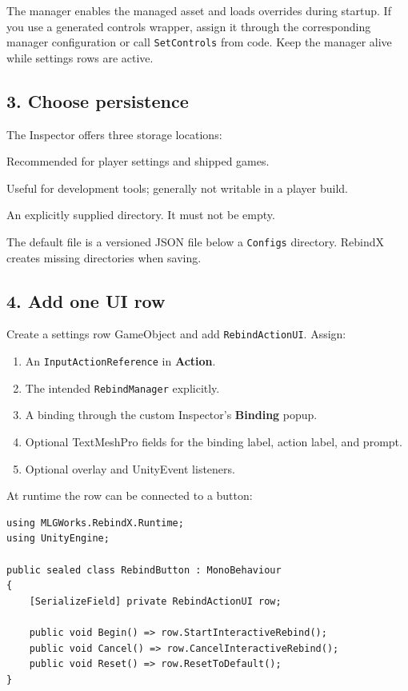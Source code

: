 \documentclass[11pt,a4paper]{article}
\newcommand{\class}[1]{\texttt{#1}}
\newcommand{\pathref}[1]{\texttt{#1}}
\begin{document}
The manager enables the managed asset and loads overrides during startup. If you use a generated controls wrapper, assign it through the corresponding manager configuration or call \class{SetControls} from code. Keep the manager alive while settings rows are active.

\subsection{3. Choose persistence}
The Inspector offers three storage locations:
\begin{description}[style=nextline,leftmargin=2.8cm]
  \item[PersistentDataPath] Recommended for player settings and shipped games.
  \item[DataPath] Useful for development tools; generally not writable in a player build.
  \item[Custom] An explicitly supplied directory. It must not be empty.
\end{description}
The default file is a versioned JSON file below a \pathref{Configs} directory. RebindX creates missing directories when saving.

\subsection{4. Add one UI row}
Create a settings row GameObject and add \class{RebindActionUI}. Assign:
\begin{enumerate}
  \item An \class{InputActionReference} in \textbf{Action}.
  \item The intended \class{RebindManager} explicitly.
  \item A binding through the custom Inspector's \textbf{Binding} popup.
  \item Optional TextMeshPro fields for the binding label, action label, and prompt.
  \item Optional overlay and UnityEvent listeners.
\end{enumerate}
At runtime the row can be connected to a button:
\begin{lstlisting}[style=csharp]
using MLGWorks.RebindX.Runtime;
using UnityEngine;

public sealed class RebindButton : MonoBehaviour
{
    [SerializeField] private RebindActionUI row;

    public void Begin() => row.StartInteractiveRebind();
    public void Cancel() => row.CancelInteractiveRebind();
    public void Reset() => row.ResetToDefault();
}
\end{lstlisting}
\end{document}
